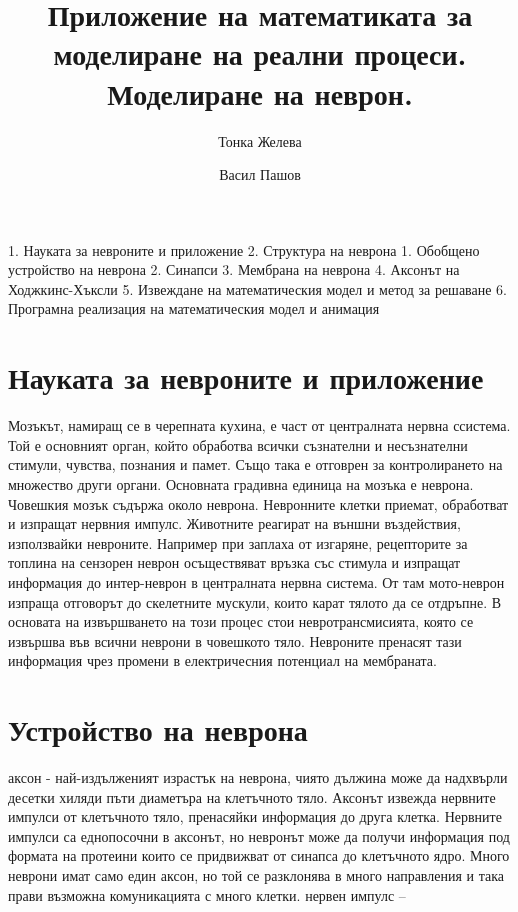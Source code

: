 \documentclass{article}
\title{Приложение на математиката за моделиране на реални процеси. Моделиране на неврон.}
\author{Тонка Желева \and Васил Пашов}
\begin{document}
\maketitle
\newpage

\tableofcontents
\newpage

1. Науката за невроните и приложение
2. Структура на неврона
  1. Обобщено устройство на неврона
  2. Синапси
3. Мембрана на неврона
4. Аксонът на Ходжкинс-Хъксли
5. Извеждане на математическия модел и метод за решаване
6. Програмна реализация на математическия модел и анимация

\section{Науката за невроните и приложение}

Мозъкът, намиращ се в черепната кухина, е част от централната нервна ссистема. Той е основният орган, който обработва всички съзнателни и несъзнателни стимули, чувства,  познания и памет. Също така е отговрен за контролирането на множество други органи. Основната градивна единица на мозъка е неврона. Човешкия мозък съдържа около   неврона. Невронните клетки приемат, обработват и изпращат нервния импулс.
Животните реагират на външни въздействия, използвайки невроните.  Например при заплаха от изгаряне, рецепторите за топлина на сензорен неврон осъществяват връзка със стимула и изпращат информация до интер-неврон в централната нервна система. От там мото-неврон изпраща отговорът до скелетните мускули, които карат тялото да се отдръпне. В основата на извършването на този процес стои невротрансмисията, която се извършва във всични неврони в човешкото тяло. Невроните пренасят тази информация чрез промени в 
електричесния потенциал на мембраната.

\section{Устройство на неврона}

аксон - най-издълженият израстък на неврона, чиято дължина може да надхвърли десетки хиляди пъти диаметъра на клетъчното тяло. Аксонът извежда нервните импулси от клетъчното тяло, пренасяйки информация до друга клетка. Нервните импулси са еднопосочни в аксонът, но невронът може да получи информация под формата на протеини които се придвижват от синапса до клетъчното ядро. Много неврони имат само един аксон, но той се разклонява в много направления и така прави възможна комуникацията с много клетки.
нервен импулс – 
\end{document}
